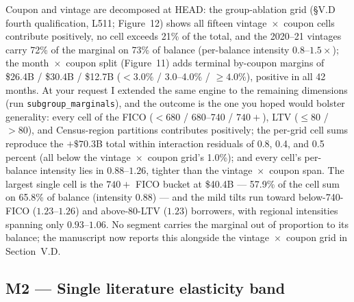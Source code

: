 \documentclass[11pt]{article}
\newcommand{\run}[1]{\texttt{#1}}
\begin{document}
Coupon and vintage are decomposed at HEAD: the group-ablation grid (\S V.D
fourth qualification, L511; Figure~12) shows all fifteen
vintage~$\times$~coupon cells contribute positively, no cell exceeds 21\% of
the total, and the 2020--21 vintages carry 72\% of the marginal on 73\% of
balance (per-balance intensity $0.8$--$1.5\times$); the month~$\times$~coupon
split (Figure~11) adds terminal by-coupon margins of \$26.4B / \$30.4B /
\$12.7B ($<3.0\%$ / 3.0--4.0\% / $\geq 4.0\%$), positive in all 42 months. At
your request I extended the same engine to the remaining dimensions
(run \run{subgroup\_marginals}), and the outcome is the one you hoped would
bolster generality: every cell of the FICO ($<680$ / 680--740 / $740+$), LTV
($\leq 80$ / $>80$), and Census-region partitions contributes positively; the
per-grid cell sums reproduce the $+\$70.3$B total within interaction residuals
of 0.8, 0.4, and 0.5 percent (all below the vintage~$\times$~coupon grid's
1.0\%); and every cell's per-balance intensity lies in $0.88$--$1.26$, tighter
than the vintage~$\times$~coupon span. The largest single cell is the $740+$
FICO bucket at \$40.4B --- 57.9\% of the cell sum on 65.8\% of balance
(intensity $0.88$) --- and the mild tilts run toward below-740-FICO
($1.23$--$1.26$) and above-80-LTV ($1.23$) borrowers, with regional
intensities spanning only $0.93$--$1.06$. No segment carries the marginal out
of proportion to its balance; the manuscript now reports this alongside the
vintage~$\times$~coupon grid in Section~V.D.

\subsection*{M2 --- Single literature elasticity band}
\end{document}
